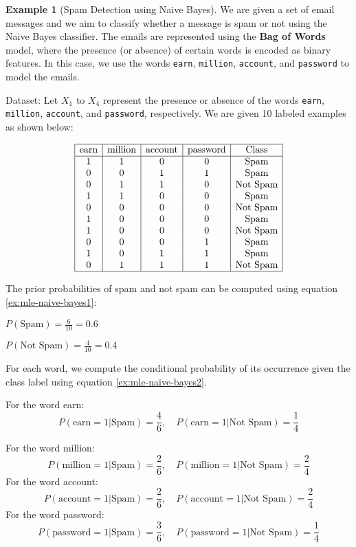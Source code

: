 \documentclass[12pt, a4paper]{article}
\theoremstyle{definition}
\newtheorem{example}{Example}[section]
\numberwithin{figure}{section}
\numberwithin{equation}{section}
\numberwithin{table}{section}
\begin{document}
\begin{example}[Spam Detection using Naive Bayes]
    We are given a set of email messages and we aim to classify whether a message is spam or not using the Naive Bayes classifier. The emails are represented using the \textbf{Bag of Words} model, where the presence (or absence) of certain words is encoded as binary features. In this case, we use the words \texttt{earn}, \texttt{million}, \texttt{account}, and \texttt{password} to model the emails.

Dataset: Let $X_1$ to $X_4$ represent the presence or absence of the words \texttt{earn}, \texttt{million}, \texttt{account}, and \texttt{password}, respectively. We are given 10 labeled examples as shown below:

\[
\begin{array}{|c|c|c|c|c|}
\hline
\text{earn} & \text{million} & \text{account} & \text{password} & \text{Class} \\
\hline
1 & 1 & 0 & 0 & \text{Spam} \\
0 & 0 & 1 & 1 & \text{Spam} \\
0 & 1 & 1 & 0 & \text{Not Spam} \\
1 & 1 & 0 & 0 & \text{Spam} \\
0 & 0 & 0 & 0 & \text{Not Spam} \\
1 & 0 & 0 & 0 & \text{Spam} \\
1 & 0 & 0 & 0 & \text{Not Spam} \\
0 & 0 & 0 & 1 & \text{Spam} \\
1 & 0 & 1 & 1 & \text{Spam} \\
0 & 1 & 1 & 1 & \text{Not Spam} \\
\hline
\end{array}
\]


The prior probabilities of spam and not spam can be computed using equation \ref{ex:mle-naive-bayes1}:

$P(\text{Spam}) = \frac{6}{10} = 0.6$

$P(\text{Not Spam}) = \frac{4}{10} = 0.4$

For each word, we compute the conditional probability of its occurrence given the class label using equation \ref{ex:mle-naive-bayes2}.

For the word earn:
$$P(\text{earn} = 1 | \text{Spam}) = \frac{4}{6}, \quad P(\text{earn} = 1 | \text{Not Spam}) = \frac{1}{4}$$

For the word million:
$$P(\text{million} = 1 | \text{Spam}) = \frac{2}{6}, \quad P(\text{million} = 1 | \text{Not Spam}) = \frac{2}{4}$$
For the word account:
$$P(\text{account} = 1 | \text{Spam}) = \frac{2}{6}, \quad P(\text{account} = 1 | \text{Not Spam}) = \frac{2}{4}$$
For the word password:
$$P(\text{password} = 1 | \text{Spam}) = \frac{3}{6}, \quad P(\text{password} = 1 | \text{Not Spam}) = \frac{1}{4}$$


\end{example}
\end{document}
